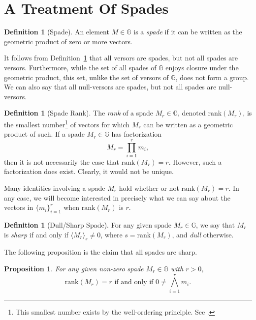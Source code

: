 \documentclass{birkjour}
\newtheorem{prop}[thm]{Proposition}
\theoremstyle{definition}
\newtheorem{defn}[thm]{Definition}
\theoremstyle{remark}
\numberwithin{equation}{section}
\newcommand{\G}{\mathbb{G}}
\newcommand{\rank}{\mbox{rank}}
\begin{document}
\section{A Treatment Of Spades}

\begin{defn}[Spade]\label{def_spade}
An element $M\in\G$ is a \emph{spade} if it can be written as the geometric
product of zero or more vectors.
\end{defn}

It follows from Definition~\ref{def_spade} that all versors are spades, but not all spades are versors.
Furthermore, while the set of all spades of $\G$ enjoys closure under the geometric product, this set,
unlike the set of versors of $\G$, does not form a group.  We can also say that all null-versors are spades,
but not all spades are null-versors.

\begin{defn}[Spade Rank]\label{def_spader_rank}
The \emph{rank} of a spade $M_r\in\G$, denoted $\rank(M_r)$, is the smallest number\footnote{This smallest number exists
by the well-ordering principle.  See \cite{}.} of vectors for which $M_r$ can
be written as a geometric product of such.  If a spade $M_r\in\G$ has factorization
\begin{equation}\label{equ_M_r_factorization}
M_r=\prod_{i=1}^r m_i,
\end{equation}
then it is not necessarily the case that $\rank(M_r)=r$.  However, such a factorization does exist.  Clearly, it
would not be unique.
\end{defn}

Many identities involving a spade $M_r$ hold whether or not $\rank(M_r)=r$.
In any case, we will become interested in precisely what we can say about the
vectors in $\{m_i\}_{i=1}^r$ when $\rank(M_r)$ is $r$.

\begin{defn}[Dull/Sharp Spade]
For any given spade $M_r\in\G$, we say that $M_r$ is \emph{sharp} if and only if
$\langle M_r\rangle_s\neq 0$, where $s=\rank(M_r)$, and \emph{dull} otherwise.
\end{defn}
The following proposition is the claim that all spades are sharp.

\begin{prop}\label{prop_spade_lin_indep}
For any given non-zero spade $M_r\in\G$ with $r>0$,
\begin{equation*}
\mbox{$\rank(M_r)=r$ if and only if $0\neq\bigwedge_{i=1}^r m_i$.}
\end{equation*}
\end{prop}
\end{document}
